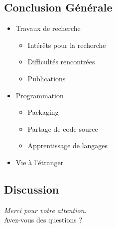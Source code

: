 \documentclass{beamer}
\begin{document}


\subsection{Conclusion Générale}
\begin{frame}
  \begin{itemize}
  \item Travaux de recherche
    \begin{itemize}
    \item Intérêts pour la recherche
    \item Difficultés rencontrées
    \item Publications
   \end{itemize}
   \vspace{3mm}
  \item Programmation
    \begin{itemize}
    \item Packaging
    \item Partage de code-source
    \item Apprentissage de langages
    \end{itemize}
\vspace{3mm}
\item Vie à l'étranger

  \end{itemize}
\end{frame}

\subsection{Discussion}
\begin{frame}
  \begin{center}
    \textit{Merci pour votre attention.}\\
    \huge{Avez-vous des questions ?}
  \end{center}
\end{frame}
\end{document}
